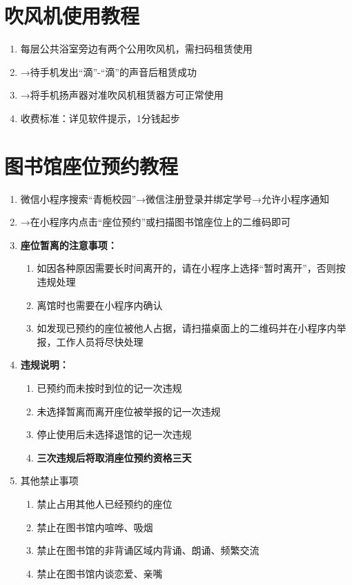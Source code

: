\section[吹风机使用教程]{吹风机使用教程}
\label{hair_drier}
\begin{enumerate}
      \item 每层公共浴室旁边有两个公用吹风机，需扫码\footnotemark 租赁使用
      \item →待手机发出“滴”-“滴”的声音后租赁成功
      \item →将手机扬声器对准吹风机租赁器方可正常使用
      \item 收费标准：详见软件提示，1分钱起步
\end{enumerate}

\section[图书馆座位预约教程]{图书馆座位预约教程}
\label{library_book}
\begin{enumerate}
      \item 微信小程序搜索“青栀校园”→微信注册登录并绑定学号→允许小程序通知
      \item →在小程序内点击“座位预约”或扫描图书馆座位上的二维码即可
      \item \textbf{座位暂离的注意事项：}
            \begin{enumerate}
                  \item 如因各种原因需要长时间离开的，请在小程序上选择“暂时离开”，否则按违规处理
                  \item 离馆时也需要在小程序内确认
                  \item 如发现已预约的座位被他人占据，请扫描桌面上的二维码并在小程序内举报，工作人员将尽快处理
            \end{enumerate}
      \item \textbf{违规说明：}
            \begin{enumerate}
                  \item 已预约而未按时到位的记一次违规
                  \item 未选择暂离而离开座位被举报的记一次违规
                  \item 停止使用后未选择退馆的记一次违规
                  \item \textbf{三次违规后将取消座位预约资格三天}
            \end{enumerate}
      \item 其他禁止事项
            \begin{enumerate}
                  \item 禁止占用其他人已经预约的座位
                  \item 禁止在图书馆内喧哗、吸烟
                  \item 禁止在图书馆的非背诵区域内背诵、朗诵、频繁交流
                  \item 禁止在图书馆内谈恋爱、亲嘴
            \end{enumerate}
\end{enumerate}

